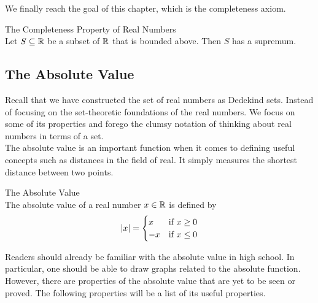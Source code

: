 \documentclass[a4paper]{article}
\begin{document}
We finally reach the goal of this chapter, which is the completeness axiom. 

\begin{thm}{The Completeness Property of Real Numbers}{}\\ Let $S\subseteq\mathbb{R}$ be a subset of $\mathbb{R}$ that is bounded above. Then $S$ has a supremum. 
\end{thm}

\subsection{The Absolute Value}
Recall that we have constructed the set of real numbers as Dedekind sets. Instead of focusing on the set-theoretic foundations of the real numbers. We focus on some of its properties and forego the clumsy notation of thinking about real numbers in terms of a set. \\

The absolute value is an important function when it comes to defining useful concepts such as distances in the field of real. It simply measures the shortest distance between two points. 

\begin{defn}{The Absolute Value}{}\\ The absolute value of a real number $x\in\mathbb{R}$ is defined by
$$\abs{x}=\begin{cases}
x & \text{if $x\geq0$} \\
-x & \text{if $x\leq0$}
\end{cases}$$
\end{defn}

Readers should already be familiar with the absolute value in high school. In particular, one should be able to draw graphs related to the absolute function. However, there are properties of the absolute value that are yet to be seen or proved. The following properties will be a list of its useful properties. 
\end{document}
